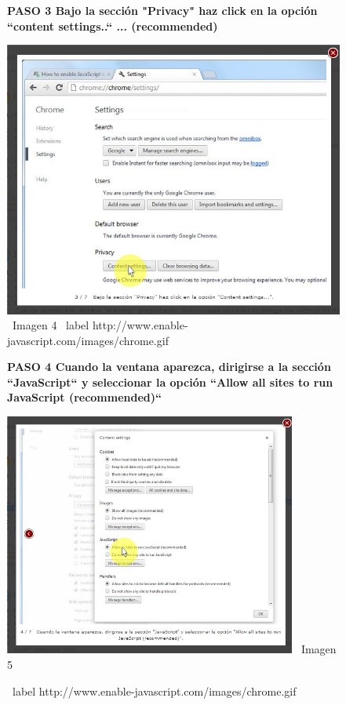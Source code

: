 \documentclass[11pt]{article} %
\begin{document}
\begin{figure}
\begin{center}
\begin{center}
\bf PASO 3
Bajo la sección "Privacy" haz click en la opción 
``content settings..`` ... (recommended)
\newline
\end{center}
\includegraphics[height=8 cm, width=8 cm] {imagenes/chrome 03.jpg}
\newline
\ Imagen 4
\ label { http://www.enable-javascript.com/images/chrome.gif }
\newline


\begin{center}
\bf PASO 4
Cuando la ventana aparezca, dirigirse a la sección ``JavaScript``  y seleccionar la opción ``Allow all sites to run JavaScript (recommended)``
\newline
\end{center}

\includegraphics[height=8cm, width=8 cm] {imagenes/chrome 04.jpg}
\newline
\ Imagen 5

\ label { http://www.enable-javascript.com/images/chrome.gif }
\end{center}
\end{figure}
\end{document}

